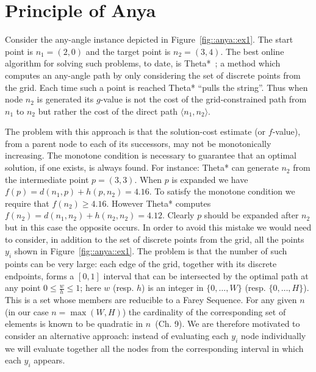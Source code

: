 \section{Principle of Anya}
Consider the any-angle instance depicted in Figure~\ref{fig::anya::ex1}. 
The start point is $n_1 = (2, 0)$ and the target
point is $n_2 = (3, 4)$.  The best online algorithm for solving such
problems, to date, is Theta*~\citep{nash07}; a method which computes
an any-angle path by only considering the set of discrete points from 
the grid. 
Each time such a point is reached Theta* ``pulls the string''.  
Thus when node $n_2$ is generated its $g$-value is not
the cost of the grid-constrained path from $n_1$ to $n_2$
but rather the cost of the direct path $\langle n_1, n_2 \rangle$.

%    

The problem with this approach is that the solution-cost estimate
(or $f$-value), from a parent node to each of its successors, may 
not be monotonically increasing.  The monotone condition is
necessary to guarantee that an optimal solution, if one exists, is always found.
For instance: Theta* can generate $n_2$ from the intermediate point $p = (3,3)$.
When $p$ is expanded we have $f(p) = d(n_1, p) + h(p, n_2) = 4.16$. 
To satisfy the monotone condition we require that $f(n_2) \geq 4.16$. However 
Theta* computes $f(n_2) = d(n_1, n_2) + h(n_2, n_2) = 4.12$.
Clearly $p$ should be expanded after $n_2$ but in this case the opposite occurs.  
In order to avoid this mistake we would need to consider, in addition to the
set of discrete points from the grid, all the points $y_i$ shown in Figure~\ref{fig::anya::ex1}.
The problem is that the number of such points can be very large:
each edge of the grid, together with its discrete endpoints, 
forms a $[0, 1]$ interval that can be intersected by the optimal
path at any point $0 \leq \frac{w}{h} \leq 1$; here $w$ (resp. $h$) is an integer in
$\{0,\dots,W\}$ (resp.  $\{0,\dots,H\}$).
This is a set whose members are reducible to a Farey Sequence.
For any given $n$ (in our case $n = \max(W, H)$) the cardinality of the corresponding 
set of elements is known to be quadratic in $n$~\citep{concrete89}(Ch. 9).
We are therefore motivated to consider an alternative approach: instead
of evaluating each $y_i$ node individually we will evaluate together
all the nodes from the corresponding interval in which each $y_i$ appears.


